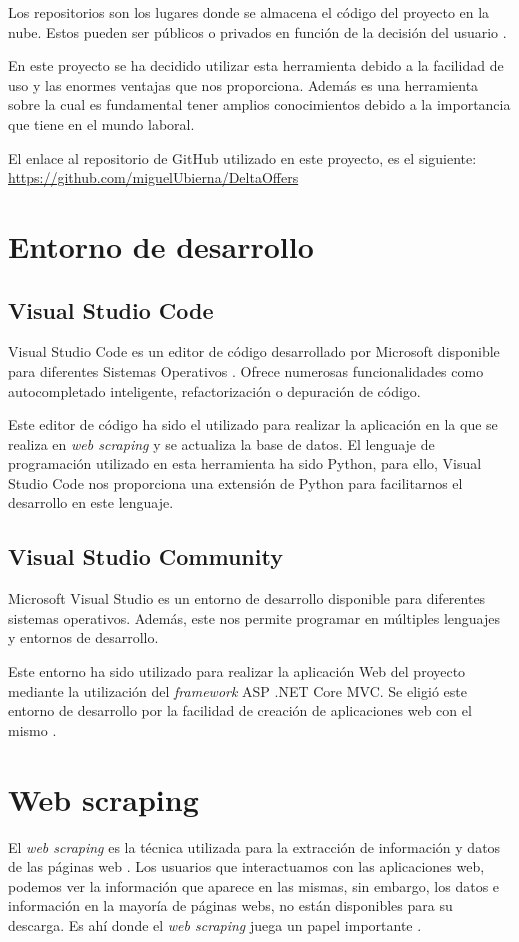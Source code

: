 Los repositorios son los lugares donde se almacena el código del proyecto en la nube. Estos pueden ser públicos o privados en función de la decisión del usuario \cite{github:latex}.

En este proyecto se ha decidido utilizar esta herramienta debido a la facilidad de uso y las enormes ventajas que nos proporciona. Además es una herramienta sobre la cual es fundamental tener amplios conocimientos debido a la importancia que tiene en el mundo laboral.

El enlace al repositorio de GitHub utilizado en este proyecto, es el siguiente: \href{https://github.com/miguelUbierna/DeltaOffers}{https://github.com/miguelUbierna/DeltaOffers}
\section{Entorno de desarrollo}

\subsection{Visual Studio Code}
Visual Studio Code es un editor de código desarrollado por Microsoft disponible para diferentes Sistemas Operativos \cite{vscode:latex}. Ofrece numerosas funcionalidades como autocompletado inteligente, refactorización o depuración de código.

Este editor de código ha sido el utilizado para realizar la aplicación en la que se realiza en \textit{web scraping} y se actualiza la base de datos. El lenguaje de programación utilizado en esta herramienta ha sido Python, para ello, Visual Studio Code nos proporciona una extensión de Python para facilitarnos el desarrollo en este lenguaje.

\subsection{Visual Studio Community}
Microsoft Visual Studio es un entorno de desarrollo disponible para diferentes sistemas operativos. Además, este nos permite programar en múltiples lenguajes y entornos de desarrollo.

Este entorno ha sido utilizado para realizar la aplicación Web del proyecto mediante la utilización del \textit{framework} ASP .NET Core MVC. Se eligió este entorno de desarrollo por la facilidad de creación de aplicaciones web con el mismo \cite{vscommunity:latex}.

\section{Web scraping}
El \textit{web scraping} es la técnica utilizada para la extracción de información y datos de las páginas web \cite{webscrapingwiki:latex}. Los usuarios que interactuamos con las aplicaciones web, podemos ver la información que aparece en las mismas, sin embargo, los datos e información en la mayoría de páginas webs, no están disponibles para su descarga. Es ahí donde el \textit{web scraping} juega un papel importante \cite{webscraping:latex}.

